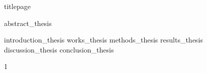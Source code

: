 \documentclass{article}
\begin{document}
%   
  {titlepage}

  {abstract_thesis}
  \restoregeometry

\twocolumn
  {introduction_thesis}
  {works_thesis}
  {methods_thesis}
  {results_thesis}
  {discussion_thesis}
  {conclusion_thesis}

\onecolumn
  \printbibliography
  \clearpage

\begin{refsection}
\twocolumn
\appendix
  {1}
   \clearpage

\onecolumn  
  \printbibliography
\end{refsection}
    
\end{document}
